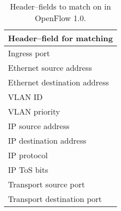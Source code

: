 \begin{table}
  \centering
  \begin{tabular}{|l|}
    \hline \textbf{Header--field for matching} \\
    \hline Ingress port \\
    \hline Ethernet source address \\
    \hline Ethernet destination address \\
    \hline VLAN ID \\
    \hline VLAN priority \\
    \hline IP source address \\
    \hline IP destination address \\
    \hline IP protocol \\
    \hline IP \ac{ToS} bits \\
    \hline Transport source port \\
    \hline Transport destination port \\
    \hline
  \end{tabular}
  \caption{Header--fields to match on in OpenFlow 1.0.}
  \label{table:openflow-1.0.headers}
\end{table}
%
